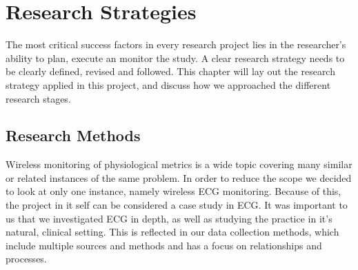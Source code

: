 \section{Research Strategies} %
\label{sec:method}

The most critical success factors in every research project lies in the researcher's ability to plan, execute an monitor the study. A clear research strategy needs to be clearly defined, revised and followed. This chapter will lay out the research strategy applied in this project, and discuss how we approached the different research stages.

\subsection{Research Methods} %
\label{sub:research_methods}

Wireless monitoring of physiological metrics is a wide topic covering many similar or related instances of the same problem. In order to reduce the scope we decided to look at only one instance, namely wireless ECG monitoring. Because of this, the project in it self can be considered a case study in ECG. It was important to us that we investigated ECG in depth, as well as studying the practice in it's natural, clinical setting. This is reflected in our data collection methods, which include multiple sources and methods and has a focus on relationships and processes.

